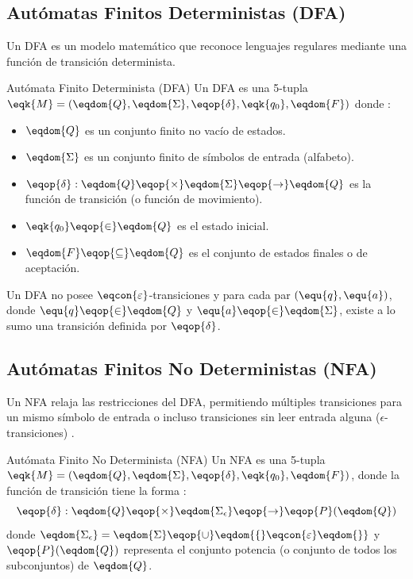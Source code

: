 \subsection{Autómatas Finitos Deterministas (DFA)}

Un DFA es un modelo matemático que reconoce lenguajes regulares mediante una función de transición determinista.

\begin{definicion}{Autómata Finito Determinista (DFA)}
  Un DFA es una 5-tupla $\eqk{M} = (\eqdom{Q}, \eqdom{\Sigma}, \eqop{\delta}, \eqk{q_0}, \eqdom{F})$ donde \cite{sipser2012introduction}:
  \begin{itemize}
    \item $\eqdom{Q}$ es un conjunto finito no vacío de estados.
    \item $\eqdom{\Sigma}$ es un conjunto finito de símbolos de entrada (alfabeto).
    \item $\eqop{\delta} : \eqdom{Q} \eqop{\times} \eqdom{\Sigma} \eqop{\rightarrow} \eqdom{Q}$ es la función de transición (o función de movimiento).
    \item $\eqk{q_0} \eqop{\in} \eqdom{Q}$ es el estado inicial.
    \item $\eqdom{F} \eqop{\subseteq} \eqdom{Q}$ es el conjunto de estados finales o de aceptación.
  \end{itemize}
  Un DFA no posee $\eqcon{\varepsilon}$-transiciones y para cada par $(\equ{q}, \equ{a})$, donde $\equ{q} \eqop{\in} \eqdom{Q}$ y $\equ{a} \eqop{\in} \eqdom{\Sigma}$, existe a lo sumo una transición definida por $\eqop{\delta}$.
\end{definicion}

\subsection{Autómatas Finitos No Deterministas (NFA)}

Un NFA relaja las restricciones del DFA, permitiendo múltiples transiciones para un mismo símbolo de entrada o incluso transiciones sin leer entrada alguna ($\epsilon$-transiciones) \cite{sipser2012introduction}.

\begin{definicion}{Autómata Finito No Determinista (NFA)}
  Un NFA es una 5-tupla $\eqk{M} = (\eqdom{Q}, \eqdom{\Sigma}, \eqop{\delta}, \eqk{q_0}, \eqdom{F})$, donde la función de transición tiene la forma \cite{sipser2012introduction}:
  \[
  \eqop{\delta} : \eqdom{Q} \eqop{\times} \eqdom{\Sigma_\epsilon} \eqop{\to} \eqop{P}(\eqdom{Q})
  \]
  donde $\eqdom{\Sigma_\epsilon} = \eqdom{\Sigma} \eqop{\cup} \eqdom{\{}\eqcon{\varepsilon}\eqdom{\}}$ y $\eqop{P}(\eqdom{Q})$ representa el conjunto potencia (o conjunto de todos los subconjuntos) de $\eqdom{Q}$.
\end{definicion}


